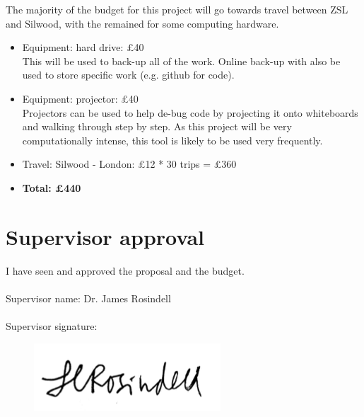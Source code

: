 \documentclass[11pt]{article}
\begin{document}
		The majority of the budget for this project will go towards travel between ZSL and Silwood, with the remained for some computing hardware. 
		
	\begin{itemize}
		\item Equipment: hard drive: £40 \\ This will be used to back-up all of the work. Online back-up with also be used to store specific work (e.g. github for code). 
		\item Equipment: projector: £40 \\ Projectors can be used to help de-bug code by projecting it onto whiteboards and walking through step by step. As this project will be very computationally intense, this tool is likely to be used very frequently. 
		\item Travel: Silwood - London: \pounds12 * 30 trips = \pounds360
		\item \textbf{Total: \pounds440}
	\end{itemize}
	
	
	\newpage
	  

	\vspace*{1\baselineskip}
	\printbibliography 


\newpage

	\section{Supervisor approval}
	\noindent
	
	I have seen and approved the proposal and the budget. \\ \\ 
	
	
	Supervisor name: Dr. James Rosindell \\ \\ 
	
	 
	
	Supervisor signature: 
	\begin{figure}[h!]
		
		\includegraphics{Images/jrsignature.png}


		
	\end{figure}
\end{document}
